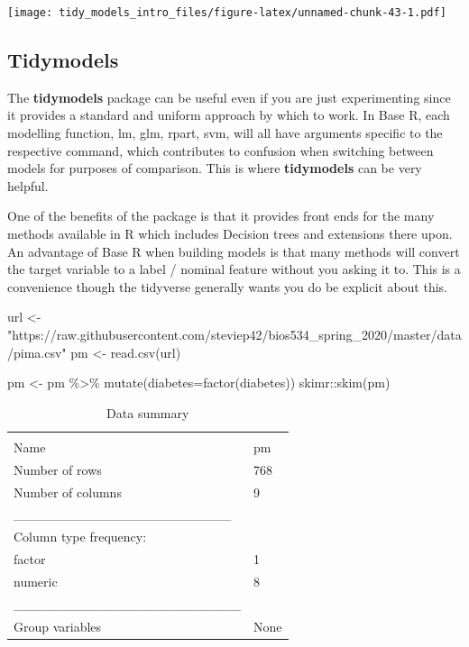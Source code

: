 \documentclass[
]{article}
\newenvironment{Shaded}{\begin{snugshade}}{\end{snugshade}}
\newcommand{\AttributeTok}[1]{\textcolor[rgb]{0.77,0.63,0.00}{#1}}
\newcommand{\FunctionTok}[1]{\textcolor[rgb]{0.00,0.00,0.00}{#1}}
\newcommand{\NormalTok}[1]{#1}
\newcommand{\OtherTok}[1]{\textcolor[rgb]{0.56,0.35,0.01}{#1}}
\newcommand{\SpecialCharTok}[1]{\textcolor[rgb]{0.00,0.00,0.00}{#1}}
\newcommand{\StringTok}[1]{\textcolor[rgb]{0.31,0.60,0.02}{#1}}
\begin{document}
\texttt{[image: tidy\_models\_intro\_files/figure-latex/unnamed-chunk-43-1.pdf]}

\hypertarget{tidymodels}{%
\subsection{Tidymodels}\label{tidymodels}}

The \textbf{tidymodels} package can be useful even if you are just
experimenting since it provides a standard and uniform approach by which
to work. In Base R, each modelling function, lm, glm, rpart, svm, will
all have arguments specific to the respective command, which contributes
to confusion when switching between models for purposes of comparison.
This is where \textbf{tidymodels} can be very helpful.

One of the benefits of the package is that it provides front ends for
the many methods available in R which includes Decision trees and
extensions there upon. An advantage of Base R when building models is
that many methods will convert the target variable to a label / nominal
feature without you asking it to. This is a convenience though the
tidyverse generally wants you do be explicit about this.

\begin{Shaded}
\begin{Highlighting}[]
\NormalTok{url }\OtherTok{\textless{}{-}} \StringTok{"https://raw.githubusercontent.com/steviep42/bios534\_spring\_2020/master/data/pima.csv"}
\NormalTok{pm }\OtherTok{\textless{}{-}} \FunctionTok{read.csv}\NormalTok{(url)}

\NormalTok{pm }\OtherTok{\textless{}{-}}\NormalTok{ pm }\SpecialCharTok{\%\textgreater{}\%} \FunctionTok{mutate}\NormalTok{(}\AttributeTok{diabetes=}\FunctionTok{factor}\NormalTok{(diabetes))}
\NormalTok{skimr}\SpecialCharTok{::}\FunctionTok{skim}\NormalTok{(pm)}
\end{Highlighting}
\end{Shaded}

\begin{longtable}[]{@{}ll@{}}
\caption{Data summary}\tabularnewline
\toprule
& \\
\midrule
\endfirsthead
\toprule
& \\
\midrule
\endhead
Name & pm \\
Number of rows & 768 \\
Number of columns & 9 \\
\_\_\_\_\_\_\_\_\_\_\_\_\_\_\_\_\_\_\_\_\_\_\_ & \\
Column type frequency: & \\
factor & 1 \\
numeric & 8 \\
\_\_\_\_\_\_\_\_\_\_\_\_\_\_\_\_\_\_\_\_\_\_\_\_ & \\
Group variables & None \\
\bottomrule
\end{longtable}
\end{document}
